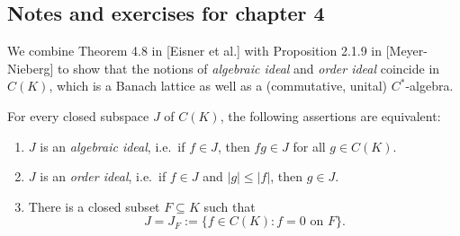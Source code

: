 \subsection{Notes and exercises for chapter 4}

We combine Theorem 4.8 in [Eisner et al.] with Proposition 2.1.9 in [Meyer-Nieberg] to show that the notions of \emph{algebraic ideal} and \emph{order ideal} coincide in $C(K)$, which is a Banach lattice as well as a (commutative, unital) $C^*$-algebra.

\begin{theorem}
	For every closed subspace $J$ of $C(K)$, the following assertions are equivalent:
	\begin{enumerate}[\upshape (i)]
		\item $J$ is an \emph{algebraic ideal}, i.e.\ if $f \in J$, then $fg \in J$ for all $g \in C(K)$.
		\item $J$ is an \emph{order ideal}, i.e.\ if $f \in J$ and $|g| \le |f|$, then $g \in J$.
		\item There is a closed subset $F \subseteq K$ such that
		\begin{equation}
			J = J_F := \{ f\in C(K) : f = 0 \text{ on } F\}.
		\end{equation}
	\end{enumerate}
\end{theorem}

